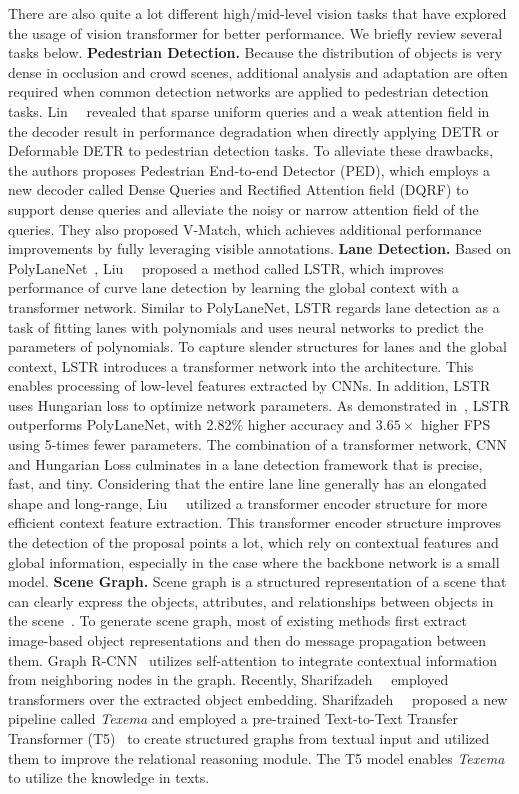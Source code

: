 There are also quite a lot different high/mid-level vision tasks that have explored the usage of vision transformer for better performance. We briefly review several tasks below.
\noindent\textbf{Pedestrian Detection.}
Because the distribution of objects is very dense in occlusion and crowd scenes, 
additional analysis and adaptation are often required when common detection networks are applied to pedestrian detection tasks.
Lin~\etal~ revealed that sparse uniform queries and a weak attention field in the decoder result in performance degradation 
when directly applying DETR or Deformable DETR to pedestrian detection tasks. 
To alleviate these drawbacks, the authors proposes Pedestrian End-to-end Detector (PED), 
which employs a new decoder called Dense Queries and Rectified Attention field (DQRF) to support dense queries and alleviate the noisy or narrow attention field of the queries.
They also proposed V-Match, which achieves additional performance improvements by fully leveraging visible annotations.
\noindent\textbf{Lane Detection.}
Based on PolyLaneNet~, Liu~\etal~ proposed a method called LSTR, 
which improves performance of curve lane detection by learning the global context with a transformer network. 
Similar to PolyLaneNet, LSTR regards lane detection as a task of fitting lanes with polynomials and uses neural networks to predict the parameters of polynomials. 
To capture slender structures for lanes and the global context, LSTR introduces a transformer network into the architecture.
This enables processing of low-level features extracted by CNNs. 
In addition, LSTR uses Hungarian loss to optimize network parameters. 
As demonstrated in~, LSTR outperforms PolyLaneNet, with 2.82\% higher accuracy and $3.65\times$ higher FPS using 5-times fewer parameters.
The combination of a transformer network, CNN and Hungarian Loss culminates in a lane detection framework that is precise, fast, and tiny. 
Considering that the entire lane line generally has an elongated shape and long-range,  
Liu~\etal~ utilized a transformer encoder structure for more efficient context feature extraction. This transformer encoder structure improves the detection of the proposal points a lot,
which rely on contextual features and global information, especially in the case where the backbone network is a small model.
\noindent\textbf{Scene Graph.}
Scene graph is a structured representation of a scene that can clearly express the objects, attributes, and relationships between objects in the scene~. To generate scene graph, most of existing methods first extract image-based object representations and then do message propagation between them. Graph R-CNN~ utilizes self-attention to integrate contextual information from neighboring nodes in the graph. Recently, Sharifzadeh~\etal~ employed transformers over the extracted object embedding. Sharifzadeh~\etal~ proposed a new pipeline called \textit{Texema} and employed a pre-trained Text-to-Text Transfer Transformer (T5)~ to create structured graphs from textual input and utilized them to improve the relational reasoning module. The T5 model enables \textit{Texema} to utilize the knowledge in texts. 
